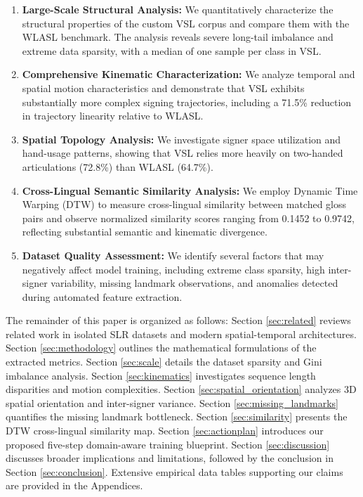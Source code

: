 \documentclass{ieeeaccess}
\begin{document}
\begin{enumerate}
\item \textbf{Large-Scale Structural Analysis:}
We quantitatively characterize the structural properties of the custom VSL corpus and compare them with the WLASL benchmark. The analysis reveals severe long-tail imbalance and extreme data sparsity, with a median of one sample per class in VSL.

\item \textbf{Comprehensive Kinematic Characterization:}
We analyze temporal and spatial motion characteristics and demonstrate that VSL exhibits substantially more complex signing trajectories, including a 71.5\% reduction in trajectory linearity relative to WLASL.

\item \textbf{Spatial Topology Analysis:}
We investigate signer space utilization and hand-usage patterns, showing that VSL relies more heavily on two-handed articulations (72.8\%) than WLASL (64.7\%).

\item \textbf{Cross-Lingual Semantic Similarity Analysis:}
We employ Dynamic Time Warping (DTW) to measure cross-lingual similarity between matched gloss pairs and observe normalized similarity scores ranging from 0.1452 to 0.9742, reflecting substantial semantic and kinematic divergence.

\item \textbf{Dataset Quality Assessment:}
We identify several factors that may negatively affect model training, including extreme class sparsity, high inter-signer variability, missing landmark observations, and anomalies detected during automated feature extraction.
\end{enumerate}

The remainder of this paper is organized as follows: Section \ref{sec:related} reviews related work in isolated SLR datasets and modern spatial-temporal architectures. Section \ref{sec:methodology} outlines the mathematical formulations of the extracted metrics. Section \ref{sec:scale} details the dataset sparsity and Gini imbalance analysis. Section \ref{sec:kinematics} investigates sequence length disparities and motion complexities. Section \ref{sec:spatial_orientation} analyzes 3D spatial orientation and inter-signer variance. Section \ref{sec:missing_landmarks} quantifies the missing landmark bottleneck. Section \ref{sec:similarity} presents the DTW cross-lingual similarity map. Section \ref{sec:actionplan} introduces our proposed five-step domain-aware training blueprint. Section \ref{sec:discussion} discusses broader implications and limitations, followed by the conclusion in Section \ref{sec:conclusion}. Extensive empirical data tables supporting our claims are provided in the Appendices.
\end{document}
